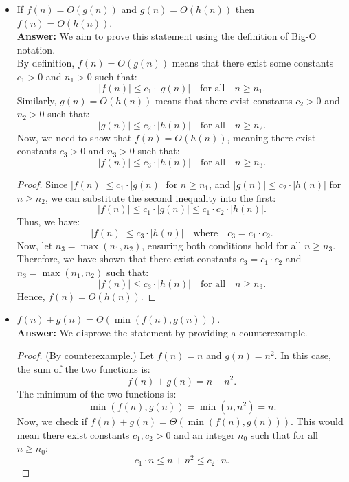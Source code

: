 \documentclass[12pt]{article}
\theoremstyle{plain}
\begin{document}
\begin{itemize}
    \item[(b)] If $f(n) = O(g(n))$ and $g(n) = O(h(n))$ then $f(n) = O(h(n)).$ \\
        \textbf{Answer: }We aim to prove this statement using the definition of Big-O notation. \\
        By definition, \( f(n) = O(g(n)) \) means that there exist some constants \( c_1 > 0 \) and \( n_1 > 0 \) such that:
        \[ |f(n)| \leq c_1 \cdot |g(n)| \quad \text{for all} \quad n \geq n_1. \]
        Similarly, \( g(n) = O(h(n)) \) means that there exist constants \( c_2 > 0 \) and \( n_2 > 0 \) such that:
        \[ |g(n)| \leq c_2 \cdot |h(n)| \quad \text{for all} \quad n \geq n_2. \]
        Now, we need to show that \( f(n) = O(h(n)) \), meaning there exist constants \( c_3 > 0 \) and \( n_3 > 0 \) such that:
        \[ |f(n)| \leq c_3 \cdot |h(n)| \quad \text{for all} \quad n \geq n_3. \]
        \begin{proof}
            Since \( |f(n)| \leq c_1 \cdot |g(n)| \) for \( n \geq n_1 \), and \( |g(n)| \leq c_2 \cdot |h(n)| \) for \( n \geq n_2 \), we can substitute the second inequality into the first:
            \[ |f(n)| \leq c_1 \cdot |g(n)| \leq c_1 \cdot c_2 \cdot |h(n)|. \]
            Thus, we have:
            \[ |f(n)| \leq c_3 \cdot |h(n)| \quad \text{where} \quad c_3 = c_1 \cdot c_2. \]
            Now, let \( n_3 = \max(n_1, n_2) \), ensuring both conditions hold for all \( n \geq n_3 \). Therefore, we have shown that there exist constants \( c_3 = c_1 \cdot c_2 \) and \( n_3 = \max(n_1, n_2) \) such that:
            \[ |f(n)| \leq c_3 \cdot |h(n)| \quad \text{for all} \quad n \geq n_3. \]
            Hence, \( f(n) = O(h(n)) \).
        \end{proof}
        \newpage
    
    \item[(c)] $f(n)+g(n) = \Theta(\min(f(n), g(n))).$ \\
        \textbf{Answer: }We disprove the statement by providing a counterexample.
        \begin{proof} (By counterexample.) Let \( f(n) = n \) and \( g(n) = n^2 \).
            In this case, the sum of the two functions is:
            \[ f(n) + g(n) = n + n^2. \]
            The minimum of the two functions is:
            \[ \min(f(n), g(n)) = \min(n, n^2) = n. \]
            Now, we check if \( f(n) + g(n) = \Theta(\min(f(n), g(n))) \). This would mean there exist constants \( c_1, c_2 > 0 \) and an integer \( n_0 \) such that for all \( n \geq n_0 \):
            \[ c_1 \cdot n \leq n + n^2 \leq c_2 \cdot n. \]


\end{proof}
\end{itemize}
\end{document}
